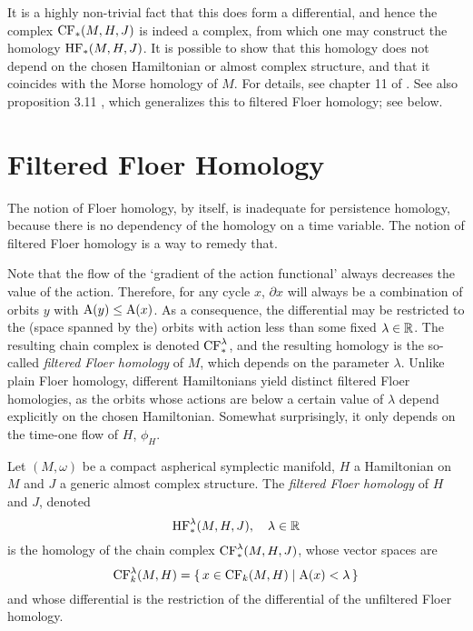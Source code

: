 It is a highly non-trivial fact that this does form a differential, and hence the complex $\CF_*(M,H,J)$ is indeed a complex, from which one may construct the homology $\HF_*(M,H,J)$. It is possible to show that this homology does not depend on the chosen Hamiltonian or almost complex structure, and that it coincides with the Morse homology of $M$. For details, see chapter 11 of \cite{audin}. See also proposition 3.11 \cite{schwarz}, which generalizes this to filtered Floer homology; see below.

\section{Filtered Floer Homology}

The notion of Floer homology, by itself, is inadequate for persistence homology, because there is no dependency of the homology on a time variable. The notion of filtered Floer homology is a way to remedy that.

Note that the flow of the `gradient of the action functional' always decreases the value of the action. Therefore, for any cycle $x$, $\partial x$ will always be a combination of orbits $y$ with $\AA(y) \leq \AA(x)$. As a consequence, the differential may be restricted to the (space spanned by the) orbits with action less than some fixed $\lambda \in \R$. The resulting chain complex is denoted $\CF_*^\lambda$, and the resulting homology is the so-called \emph{filtered Floer homology} of $M$, which depends on the parameter $\lambda$. Unlike plain Floer homology, different Hamiltonians yield distinct filtered Floer homologies, as the orbits whose actions are below a certain value of $\lambda$ depend explicitly on the chosen Hamiltonian. Somewhat surprisingly, it only depends on the time-one flow of $H$, $\phi_H$.

\begin{definition}
Let $(M,\omega)$ be a compact aspherical symplectic manifold, $H$ a Hamiltonian on $M$ and $J$ a generic almost complex structure. The \emph{filtered Floer homology} of $H$ and $J$, denoted
\begin{equation}
\HF^\lambda_*(M,H,J), \quad \lambda \in \R
\end{equation}
is the homology of the chain complex $\CF^\lambda_*(M,H,J)$, whose vector spaces are
\begin{equation}
\CF^\lambda_k(M,H) = \{\, x \in \CF_k(M,H) \mid \AA(x) < \lambda\,\}
\end{equation}
and whose differential is the restriction of the differential of the unfiltered Floer homology.
\end{definition}

